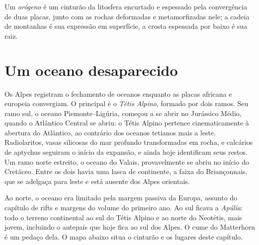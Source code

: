 \begin{definition}[Orógeno]\label{def:b2:alpine-orogen:orogen}
Um \emph{orógeno} é um cinturão da litosfera encurtado e espessado pela
convergência de duas placas, junto com as rochas deformadas e metamorfizadas nele; a
cadeia de montanhas é sua expressão em superfície, a crosta espessada por baixo é sua raiz.
\end{definition}

\section{Um oceano desaparecido}\label{sec:b2:alpine-orogen:tethys}

Os Alpes registram o fechamento de oceanos enquanto as placas africana e europeia convergiam.
O principal é o \emph{Tétis Alpino}, formado por dois ramos. Seu ramo sul, o
oceano Piemonte--Ligúria, começou a se abrir no Jurássico Médio, quando o Atlântico Central
se abriu: o Tétis Alpino pertence cinematicamente à abertura do Atlântico, ao contrário dos
oceanos tetianos mais a leste. Radiolaritos, vasas silicosas do mar profundo transformadas em rocha,
e calcários de aptychus seguiram o início da expansão, e ainda hoje identificam seus
restos. Um ramo norte estreito, o oceano do Valais, provavelmente se abriu no início do
Cretáceo. Entre os dois havia uma lasca de continente, a faixa do Briançonnais, que se adelgaça
para leste e está ausente dos Alpes orientais.

Ao norte, o oceano era limitado pela margem passiva da Europa, assunto do capítulo de rifts e
margens do volume do primeiro ano. Ao sul ficava a \emph{Apúlia}: todo o terreno continental
ao sul do Tétis Alpino e ao norte do Neotétis, mais jovem, incluindo o antepaís
que hoje fica ao sul dos Alpes. O cume do Matterhorn é um pedaço dela.
O mapa abaixo situa o cinturão e os lugares deste capítulo.


